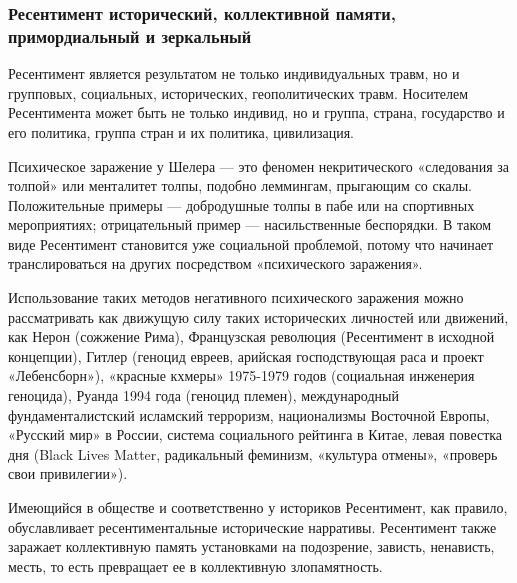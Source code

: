 
 
 
 
 

\subsubsection{Ресентимент исторический, коллективной памяти, примордиальный и зеркальный}
\label{sec:11_02_2022.stz.news.ua.hvylya.1.vse_zlo_ot_ressentimenta.2.istoricheskij_koll_pamjati}

Ресентимент является результатом не только индивидуальных травм, но и
групповых, социальных, исторических, геополитических травм. Носителем
Ресентимента может быть не только индивид, но и группа, страна, государство и
его политика, группа стран и их политика, цивилизация.

Психическое заражение у Шелера — это феномен некритического «следования за
толпой» или менталитет толпы, подобно леммингам, прыгающим со скалы.
Положительные примеры — добродушные толпы в пабе или на спортивных
мероприятиях; отрицательный пример — насильственные беспорядки. В таком виде
Ресентимент становится уже социальной проблемой, потому что начинает
транслироваться на других посредством «психического заражения».

Использование таких методов негативного психического заражения можно
рассматривать как движущую силу таких исторических личностей или движений, как
Нерон (сожжение Рима), Французская революция (Ресентимент в исходной
концепции), Гитлер (геноцид евреев, арийская господствующая раса и проект
«Лебенсборн»), «красные кхмеры» 1975-1979 годов (социальная инженерия
геноцида), Руанда 1994 года (геноцид племен), международный фундаменталистский
исламский терроризм, национализмы Восточной Европы, «Русский мир» в России,
система социального рейтинга в Китае, левая повестка дня (Black Lives Matter,
радикальный феминизм, «культура отмены», «проверь свои привилегии»).

Имеющийся в обществе и соответственно у историков Ресентимент, как правило,
обуславливает ресентиментальные исторические нарративы. Ресентимент также
заражает коллективную память установками на подозрение, зависть, ненависть,
месть, то есть превращает ее в коллективную злопамятность.

